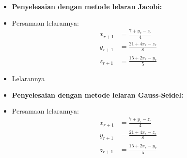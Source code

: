 \documentclass[pdflatex,compress,mathserif]{beamer}
\begin{document}
\begin{frame}
	\begin{itemize}
		\item \textbf{Penyelesaian dengan metode lelaran Jacobi:}
		\item Persamaan lelarannya:
		\begin{align*}
			x_{r+1} &= \frac{7 + y_r - z_r}{4} \\
			y_{r+1} &= \frac{21 + 4 x_r - z_r}{8} \\
			z_{r+1} &= \frac{15 + 2 x_r - y_r}{5}
		\end{align*}
	\end{itemize}
\end{frame}

\begin{frame}
	\begin{itemize}
		\item Lelarannya
	\end{itemize}
	\centering
\end{frame}

\begin{frame}
	\begin{itemize}
		\item \textbf{Penyelesaian dengan metode lelaran Gauss-Seidel:}
		\item Persamaan lelarannya:
		\begin{align*}
		x_{r+1} &= \frac{7 + y_r - z_r}{4} \\
		y_{r+1} &= \frac{21 + 4 x_r - z_r}{8} \\
		z_{r+1} &= \frac{15 + 2 x_r - y_r}{5}
		\end{align*}
	\end{itemize}
\end{frame}
\end{document}
